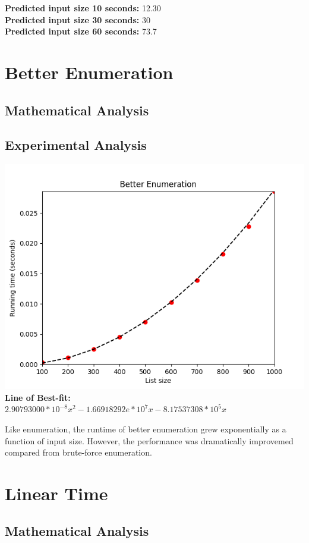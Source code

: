 \documentclass{article}
\begin{document}
    \textbf{Predicted input size 10 seconds:} 12.30\\
    \textbf{Predicted input size 30 seconds:} 30\\
    \textbf{Predicted input size 60 seconds:} 73.7\\


\section{Better Enumeration}
  \subsection{Mathematical Analysis}
  \subsection{Experimental Analysis}
    \includegraphics{better_enumeration.png}
    \textbf{Line of Best-fit:}\\
    $2.90793000*10^{-8}x^2 - 1.66918292e*10^7x - 8.17537308*10^5x$

    Like enumeration, the runtime of better enumeration grew exponentially as a function of input size.  However, the performance was dramatically improvemed compared from brute-force enumeration.\\

\section{Linear Time}
  \subsection{Mathematical Analysis}
\end{document}
